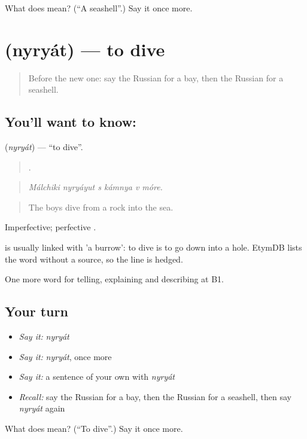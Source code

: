 \begin{tcolorbox}[breakable,colback=teal!4,colframe=teal!35!black,title={Before you move on}]
What does  mean? (\textquotedblleft{}A seashell\textquotedblright{}.) Say it once more.
\end{tcolorbox}
\section[\texorpdfstring{\ru{нырять} (nyryát)}{нырять (nyryát)}]{ (nyryát) — to dive}

\label{lesson:RU-C463-nyryat}



\begin{quote}
Before the new one: say the Russian for a bay, then the Russian for a seashell.
\end{quote}

\subsection*{You'll want to know: }
\textbf{} (\emph{nyryát}) — \textquotedblleft{}to dive\textquotedblright{}.

\begin{quote}
     .
\end{quote}

\begin{quote}
\emph{Málchiki nyryáyut s kámnya v móre.}
\end{quote}

\begin{quote}
The boys dive from a rock into the sea.
\end{quote}

Imperfective; perfective \emph{}.

\begin{cousinweb}
\emph{} is usually linked with \emph{} 'a burrow': to dive is to go down into a hole. EtymDB lists the word without a source, so the line is hedged.
\end{cousinweb}

\begin{grammarlens}[title={What you've built}]
One more word for telling, explaining and describing at B1.
\end{grammarlens}

\subsection*{Your turn}
\begin{itemize}
\raggedright
  \item \emph{Say it:} \emph{nyryát}
  \item \emph{Say it:} \emph{nyryát}, once more
  \item \emph{Say it:} a sentence of your own with \emph{nyryát}
  \item \emph{Recall:} say the Russian for a bay, then the Russian for a seashell, then say \emph{nyryát} again
\end{itemize}

\begin{tcolorbox}[breakable,colback=teal!4,colframe=teal!35!black,title={Before you move on}]
What does  mean? (\textquotedblleft{}To dive\textquotedblright{}.) Say it once more.
\end{tcolorbox}
